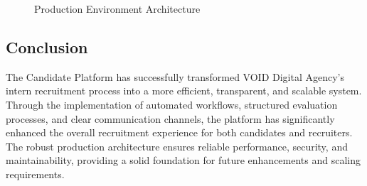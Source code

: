 \begin{figure}[H]
    \centering
    \caption{Production Environment Architecture}
    \label{fig:production_architecture}
\end{figure}

\subsection{Conclusion}
\noindent
The Candidate Platform has successfully transformed VOID Digital Agency's intern recruitment process into a more efficient, transparent, and scalable system. Through the implementation of automated workflows, structured evaluation processes, and clear communication channels, the platform has significantly enhanced the overall recruitment experience for both candidates and recruiters. The robust production architecture ensures reliable performance, security, and maintainability, providing a solid foundation for future enhancements and scaling requirements.

